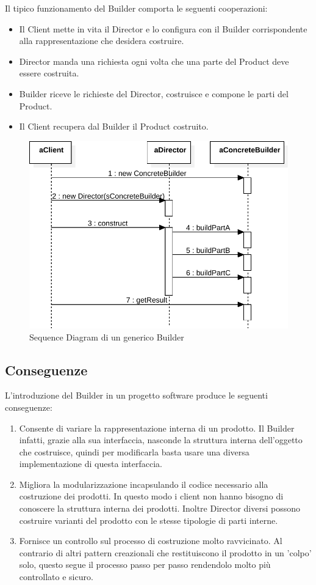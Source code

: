 Il tipico funzionamento del Builder comporta le seguenti cooperazioni:
\begin{itemize}
\item Il Client mette in vita il Director e lo configura con il Builder corrispondente alla rappresentazione che desidera costruire.
\item Director manda una richiesta ogni volta che una parte del Product deve essere costruita.
\item Builder riceve le richieste del Director, costruisce e compone le parti del Product.
\item Il Client recupera dal Builder il Product costruito.
\end{itemize}
\begin{figure}[htbp]
\centering
\includegraphics[width=\textwidth,height=\textheight,keepaspectratio]{images/builder-pattern-sequence.pdf}
\caption{Sequence Diagram di un generico Builder}
\label{fig:builder-pattern-sequence}
\end{figure} 

\subsection{Conseguenze}
L'introduzione del Builder in un progetto software produce le seguenti conseguenze:

\begin{enumerate}
\item Consente di variare la rappresentazione interna di un prodotto. Il Builder infatti, grazie alla sua interfaccia, nasconde la struttura interna dell'oggetto che costruisce, quindi per modificarla basta usare una diversa implementazione di questa interfaccia.
\item Migliora la modularizzazione incapsulando il codice necessario alla costruzione dei prodotti. In questo modo i client non hanno bisogno di conoscere la struttura interna dei prodotti. Inoltre Director diversi possono costruire varianti del prodotto con le stesse tipologie di parti interne.
\item Fornisce un controllo sul processo di costruzione molto ravvicinato. Al contrario di altri pattern creazionali che restituiscono il prodotto in un 'colpo' solo, questo segue il processo passo per passo rendendolo molto più controllato e sicuro.
\end{enumerate}

